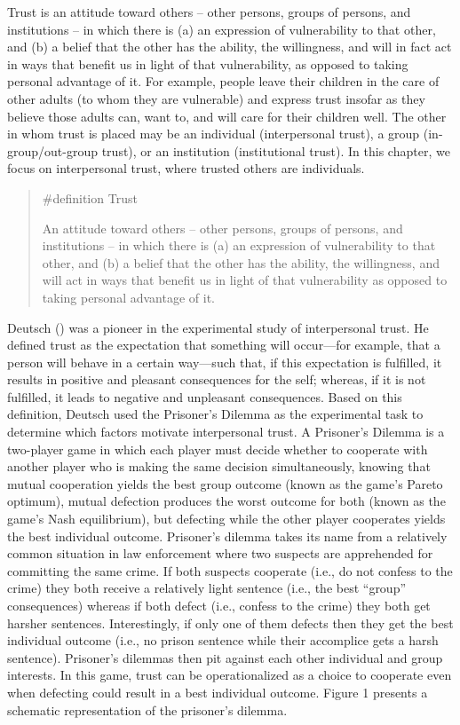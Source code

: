 \documentclass[
  letterpaper,
]{book}
\begin{document}
Trust is an attitude toward others -- other persons, groups of persons,
and institutions -- in which there is (a) an expression of vulnerability
to that other, and (b) a belief that the other has the ability, the
willingness, and will in fact act in ways that benefit us in light of
that vulnerability, as opposed to taking personal advantage of it. For
example, people leave their children in the care of other adults (to
whom they are vulnerable) and express trust insofar as they believe
those adults can, want to, and will care for their children well. The
other in whom trust is placed may be an individual (interpersonal
trust), a group (in-group/out-group trust), or an institution
(institutional trust). In this chapter, we focus on interpersonal trust,
where trusted others are individuals.

\begin{quote}
\label{def-trust}{\#definition} Trust

An attitude toward others -- other persons, groups of persons, and
institutions -- in which there is (a) an expression of vulnerability to
that other, and (b) a belief that the other has the ability, the
willingness, and will act in ways that benefit us in light of that
vulnerability as opposed to taking personal advantage of it.
\end{quote}

Deutsch () was a pioneer in the
experimental study of interpersonal trust. He defined trust as the
expectation that something will occur---for example, that a person will
behave in a certain way---such that, if this expectation is fulfilled,
it results in positive and pleasant consequences for the self; whereas,
if it is not fulfilled, it leads to negative and unpleasant
consequences. Based on this definition, Deutsch used the Prisoner's
Dilemma as the experimental task to determine which factors motivate
interpersonal trust. A Prisoner's Dilemma is a two-player game in which
each player must decide whether to cooperate with another player who is
making the same decision simultaneously, knowing that mutual cooperation
yields the best group outcome (known as the game's Pareto optimum),
mutual defection produces the worst outcome for both (known as the
game's Nash equilibrium), but defecting while the other player
cooperates yields the best individual outcome. Prisoner's dilemma takes
its name from a relatively common situation in law enforcement where two
suspects are apprehended for committing the same crime. If both suspects
cooperate (i.e., do not confess to the crime) they both receive a
relatively light sentence (i.e., the best ``group'' consequences)
whereas if both defect (i.e., confess to the crime) they both get
harsher sentences. Interestingly, if only one of them defects then they
get the best individual outcome (i.e., no prison sentence while their
accomplice gets a harsh sentence). Prisoner's dilemmas then pit against
each other individual and group interests. In this game, trust can be
operationalized as a choice to cooperate even when defecting could
result in a best individual outcome. Figure 1 presents a schematic
representation of the prisoner's dilemma.
\end{document}
